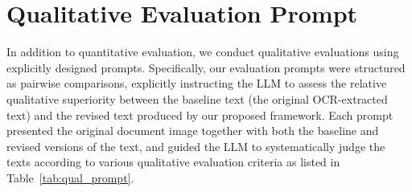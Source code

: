 \documentclass[11pt]{article}
\begin{document}
\section{Qualitative Evaluation Prompt}
\label{apn:QEP} 

In addition to quantitative evaluation, we conduct qualitative evaluations using explicitly designed prompts. Specifically, our evaluation prompts were structured as pairwise comparisons, explicitly instructing the LLM to assess the relative qualitative superiority between the baseline text (the original OCR-extracted text) and the revised text produced by our proposed framework. Each prompt presented the original document image together with both the baseline and revised versions of the text, and guided the LLM to systematically judge the texts according to various qualitative evaluation criteria as listed in Table~\ref{tab:qual_prompt}.




\end{document}
